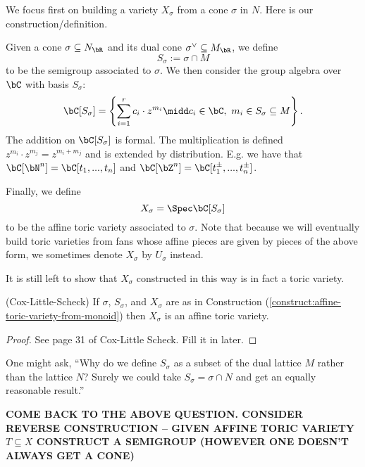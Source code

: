 We focus first on building a variety $X_\sigma$ from a cone $\sigma$ in $N$. Here is our construction/definition.
\begin{construct}\label{construct:affine-toric-variety-from-monoid}
	Given a cone $\sigma \subseteq N_\bR$ and its dual cone $\sigma^{\vee} \subseteq M_\bR$, we define
	\begin{equation}\label{eqn:semigroup-assoc-to-cone}
		S_\sigma := \sigma \cap M
	\end{equation}
	to be the semigroup associated to $\sigma$. We then consider the group algebra over $\bC$ with basis $S_\sigma$:
	\begin{equation}\label{eqn:ring-assoc-to-cone}
		\bC[S_\sigma] = \left\{\sum_{i=1}^{r} c_i \cdot z^{m_i} \midd c_i \in \bC, ~m_i \in S_\sigma \subseteq M\right\}.
	\end{equation}
	The addition on $\bC[S_\sigma]$ is formal. The multiplication is defined $z^{m_i}\cdot z^{m_j} = z^{m_i + m_j}$ and is extended by distribution. E.g. we have that $\bC[\bN^n] = \bC[t_1,...,t_n]$ and $\bC[\bZ^n] = \bC[t_1^{\pm},...,t_n^{\pm}]$.

	Finally, we define
	\begin{equation}\label{eqn:affine-toric-variety}
	    X_\sigma = \Spec \bC[S_\sigma]
	\end{equation}
	to be the affine toric variety associated to $\sigma$. Note that because we will eventually build toric varieties from fans whose affine pieces are given by pieces of the above form, we sometimes denote $X_\sigma$ by $U_\sigma$ instead.
\end{construct}
It is still left to show that $X_\sigma$ constructed in this way is in fact a toric variety.

\begin{prop}(Cox-Little-Scheck)\label{prop:variety-assoc-to-cone-is-toric}
	If $\sigma$, $S_\sigma$, and $X_\sigma$ are as in Construction (\ref{construct:affine-toric-variety-from-monoid}) then $X_\sigma$ is an affine toric variety.
\end{prop}
\begin{proof}
	See page 31 of Cox-Little Scheck. Fill it in later.
\end{proof}
One might ask, ``Why do we define $S_\sigma$ as a subset of the dual lattice $M$ rather than the lattice $N$? Surely we could take $S_\sigma = \sigma \cap N$ and get an equally reasonable result.''

\begin{center}
	\textbf{COME BACK TO THE ABOVE QUESTION. CONSIDER REVERSE CONSTRUCTION -- GIVEN AFFINE TORIC VARIETY $T \subseteq X$ CONSTRUCT A SEMIGROUP (HOWEVER ONE DOESN'T ALWAYS GET A CONE)}
\end{center}

